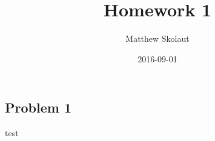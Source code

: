 \documentclass{article}
\title{Homework 1}
\date{2016-09-01}
\author{Matthew Skolaut}
\begin{document}
	\maketitle
	\newpage
	
	\begin{Problem Set 1}
	\subsection{Problem 1}
	\end{Problem Set 1}
	test
\end{document}
